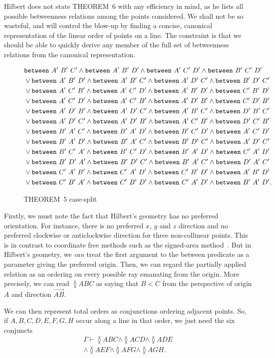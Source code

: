 Hilbert does not state THEOREM~6 with any efficiency in mind, as he lists all possible betweenness relations among the points considered. We shall not be so wasteful, and will control the blow-up by finding a concise, canonical representation of the linear order of points on a line. The constraint is that we should be able to quickly derive any member of the full set of betweenness relations from the canonical representation.

\begin{figure}
  \begin{align*}
    &\fourbetlong{A'}{B'}{C'}{D'}\\
    &\vee\fourbetlong{A'}{B'}{D'}{C'}\\
    &\vee\fourbetlong{A'}{C'}{B'}{D'}\\
    &\vee\fourbetlong{A'}{C'}{D'}{B'}\\
    &\vee\fourbetlong{A'}{D'}{B'}{C'}\\
    &\vee\fourbetlong{A'}{D'}{C'}{B'}\\
    &\vee\fourbetlong{B'}{A'}{C'}{D'}\\
    &\vee\fourbetlong{B'}{A'}{D'}{C'}\\
    &\vee\fourbetlong{B'}{C'}{A'}{D'}\\
    &\vee\fourbetlong{B'}{D'}{A'}{C'}\\
    &\vee\fourbetlong{C'}{A'}{B'}{D'}\\
    &\vee\fourbetlong{C'}{B'}{A'}{D'}.
  \end{align*}
\caption{THEOREM~5 case-split}
\label{fig:Theorem5CasesFormalised}
\end{figure}

Firstly, we must note the fact that Hilbert's geometry has no preferred orientation. For instance, there is no preferred $x$, $y$ and $z$ direction and no preferred clockwise or anticlockwise direction for three non-collinear points. This is in contrast to coordinate free methods such as the signed-area method~\cite{SignedAreaMethod}. But in Hilbert's geometry, we \emph{can} treat the first argument to the between predicate as a parameter giving the preferred origin. Then, we can regard the partially applied relation as an ordering on every possible ray emanating from the origin. More precisely, we can read $\between{A}{B}{C}$ as saying that $B<C$ from the perspective of origin $A$ and direction $\overrightarrow{AB}$.

We can then represent total orders as conjunctions ordering adjacent points. So, if $A,B,C,D,E,F,G,H$ occur along a line in that order, we just need the six conjuncts
\begin{multline}\label{theorem:OrderRepExample}
\Gamma \vdash \between{A}{B}{C} \wedge \between{A}{C}{D} \wedge \between{A}{D}{E}\\
\wedge\between{A}{E}{F}\wedge\between{A}{F}{G}\wedge\between{A}{G}{H}.
\end{multline}

